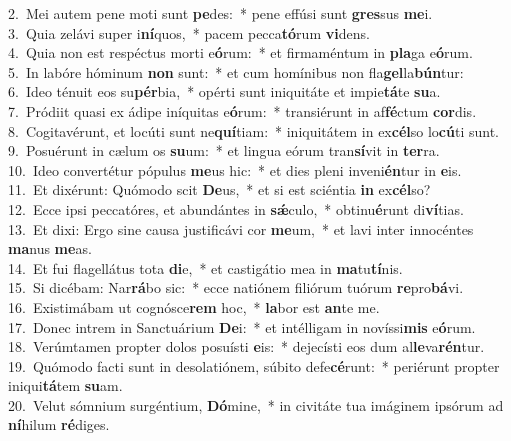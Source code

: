 {2.~}Mei autem pene moti sunt \textbf{pe}des:~* pene effúsi sunt \textbf{gres}sus \textbf{me}i.\\
{3.~}Quia zelávi super i\textbf{ní}quos,~* pacem pecca\textbf{tó}rum \textbf{vi}dens.\\
{4.~}Quia non est respéctus morti e\textbf{ó}rum:~* et firmaméntum in \textbf{pla}ga e\textbf{ó}rum.\\
{5.~}In labóre hóminum \textbf{non} sunt:~* et cum homínibus non fla\textbf{gel}la\textbf{bún}tur:\\
{6.~}Ideo ténuit eos su\textbf{pér}bia,~* opérti sunt iniquitáte et impie\textbf{tá}te \textbf{su}a.\\
{7.~}Pródiit quasi ex ádipe iníquitas e\textbf{ó}rum:~* transiérunt in af\textbf{fé}ctum \textbf{cor}dis.\\
{8.~}Cogitavérunt, et locúti sunt ne\textbf{quí}tiam:~* iniquitátem in ex\textbf{cél}so lo\textbf{cú}ti sunt.\\
{9.~}Posuérunt in cælum os \textbf{su}um:~* et lingua eórum tran\textbf{sí}vit in \textbf{ter}ra.\\
{10.~}Ideo convertétur pópulus \textbf{me}us hic:~* et dies pleni inveni\textbf{én}tur in \textbf{e}is.\\
{11.~}Et dixérunt: Quómodo scit \textbf{De}us,~* et si est sciéntia \textbf{in} ex\textbf{cél}so?\\
{12.~}Ecce ipsi peccatóres, et abundántes in \textbf{sǽ}culo,~* obtinu\textbf{é}runt di\textbf{ví}tias.\\
{13.~}Et dixi: Ergo sine causa justificávi cor \textbf{me}um,~* et lavi inter innocéntes \textbf{ma}nus \textbf{me}as.\\
{14.~}Et fui flagellátus tota \textbf{di}e,~* et castigátio mea in \textbf{ma}tu\textbf{tí}nis.\\
{15.~}Si dicébam: Nar\textbf{rá}bo sic:~* ecce natiónem filiórum tuórum \textbf{re}pro\textbf{bá}vi.\\
{16.~}Existimábam ut cognósce\textbf{rem} hoc,~* \textbf{la}bor est \textbf{an}te me.\\
{17.~}Donec intrem in Sanctuárium \textbf{De}i:~* et intélligam in novíssi\textbf{mis} e\textbf{ó}rum.\\
{18.~}Verúmtamen propter dolos posuísti \textbf{e}is:~* dejecísti eos dum al\textbf{le}va\textbf{rén}tur.\\
{19.~}Quómodo facti sunt in desolatiónem, súbito defe\textbf{cé}runt:~* periérunt propter iniqui\textbf{tá}tem \textbf{su}am.\\
{20.~}Velut sómnium surgéntium, \textbf{Dó}mine,~* in civitáte tua imáginem ipsórum ad \textbf{ní}hilum \textbf{ré}diges.\\

